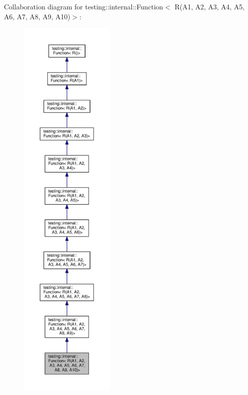 Collaboration diagram for testing\+:\+:internal\+:\+:Function$<$ R(A1, A2, A3, A4, A5, A6, A7, A8, A9, A10)$>$\+:
\nopagebreak
\begin{figure}[H]
\begin{center}
\leavevmode
\includegraphics[height=550pt]{structtesting_1_1internal_1_1_function_3_01_r_07_a1_00_01_a2_00_01_a3_00_01_a4_00_01_a5_00_01_a69dda6c3370932e2c0a4fbe8e2e777dca}
\end{center}
\end{figure}
